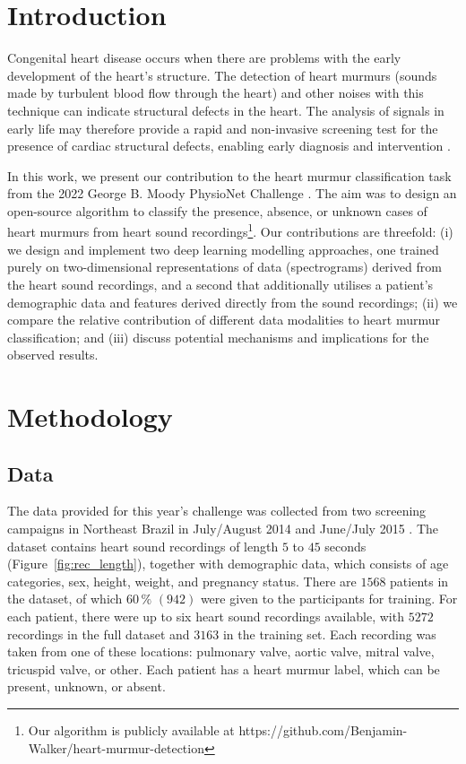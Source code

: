 \documentclass[twocolumn]{cinc}
\begin{document}
\section{Introduction} Congenital heart disease occurs when there are problems with the early development of the heart's structure. The detection of heart murmurs (sounds made by turbulent blood flow through the heart) and other noises with this technique can indicate structural defects in the heart. The analysis of signals in early life may therefore provide a rapid and non-invasive screening test for the presence of cardiac structural defects, enabling early diagnosis and intervention \cite{frank2011evaluation}. 





In this work, we present our contribution to the heart murmur classification task from the 2022 George B. Moody PhysioNet Challenge \cite{goldberger2000physiobank}. The aim was to design an open-source algorithm to classify the presence, absence, or unknown cases of heart murmurs from heart sound recordings\footnote{Our algorithm is publicly available at https://github.com/Benjamin-Walker/heart-murmur-detection}. Our contributions are threefold: (i) we design and implement two deep learning modelling approaches, one trained purely on two-dimensional representations of data (spectrograms) derived from the heart sound recordings, and a second that additionally utilises a patient's demographic data and features derived directly from the sound recordings; (ii) we compare the relative contribution of different data modalities to heart murmur classification; and 
(iii) discuss potential mechanisms and implications for the observed results.


\section{Methodology}

\subsection{Data}
The data provided for this year's challenge was collected from two screening campaigns in Northeast Brazil in July/August 2014 and June/July 2015 \cite{oliveira2021circor}. The dataset contains heart sound recordings of length $5$ to $45$ seconds (Figure~\ref{fig:rec_length}), together with demographic data, which consists of age categories, sex, height, weight, and pregnancy status. There are $1568$ patients in the dataset, of which $60\,\%$ $(942)$ were given to the participants for training. For each patient, there were up to six heart sound recordings available, with $5272$ recordings in the full dataset and $3163$ in the training set. Each recording was taken from one of these locations: pulmonary valve, aortic valve, mitral valve, tricuspid valve, or other. Each patient has a heart murmur label, which can be present, unknown, or absent.
\end{document}
